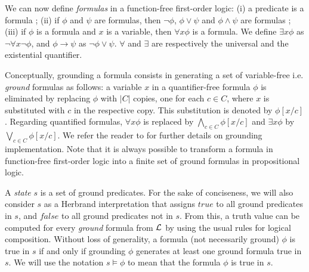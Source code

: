 \documentclass[letterpaper]{article} %
\begin{document}
We can now define {\it formulas} in a function-free first-order logic: (i) a predicate is a formula ; (ii) if ${\phi}$ and ${\psi}$ are formulas, then $\neg \phi$, $\phi \vee \psi$ and $\phi \wedge \psi$ are formulas ; (iii) if $\phi$ is a formula and $x$ is a variable, then $\forall x \phi$ is a formula. We define $\exists x \phi$ as $\neg \forall x \neg \phi$, and $\phi \rightarrow \psi$ as $\neg \phi \vee \psi$. $\forall$ and $\exists$ are respectively the universal and the existential quantifier.

Conceptually, grounding a formula consists in generating a set of variable-free i.e. {\it ground} formulas \cite{helmert} as follows: a variable $x$ in a quantifier-free formula $\phi$ is eliminated by replacing $\phi$ with $|C|$ copies, one for each $c \in C$, where $x$ is substituted with $c$ in the respective copy. This substitution is denoted by $\phi[x/c]$. Regarding quantified formulas, $\forall x \phi$ is replaced by $\bigwedge_{c \in C} \phi[x/c]$ and $\exists x \phi$ by $\bigvee_{c \in C} \phi[x/c]$. We refer the reader to \cite{behnke20,ramoul17} for further details on grounding implementation. Note that it is always possible to transform a formula in function-free first-order logic into a finite set of ground formulas in propositional logic.

A {\it state} $s$ is a set of ground predicates. For the sake of conciseness, we will also consider $s$ as a Herbrand interpretation that assigns $true$ to all ground predicates in $s$, and $false$ to all ground predicates not in $s$. From this, a truth value can be computed for every {\it ground} formula from ${\cal{L}}$ by using the usual rules for logical composition.
Without loss of generality, a formula (not necessarily ground) $\phi$ is true in $s$ if and only if grounding $\phi$ generates at least one ground formula true in $s$. We will use the notation $s \models \phi$ to mean that the formula $\phi$ is true in $s$.
\end{document}
